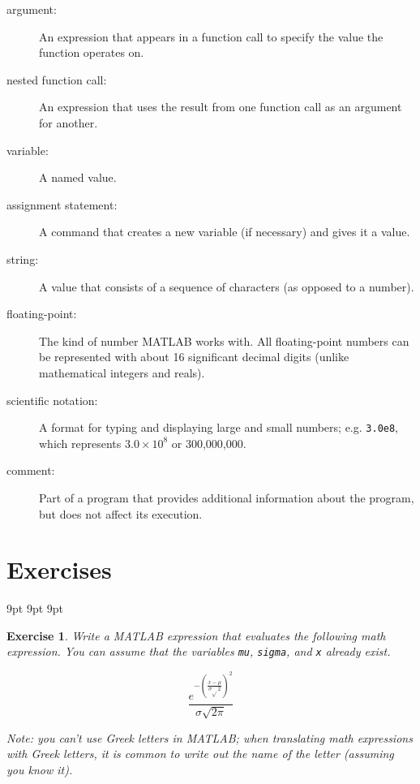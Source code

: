 \documentclass[
]{book}
\begin{document}
\begin{description}
\item[argument:] An expression that appears in a function call to
specify the value the function operates on.

\item[nested function call:] An expression that uses the result from
one function call as an argument for another.

\item[variable:] A named value.

\item[assignment statement:] A command that creates a new variable
(if necessary) and gives it a value.

\item[string:] A value that consists of a sequence of characters (as
opposed to a number).

\item[floating-point:] The kind of number MATLAB works with.  All
floating-point numbers can be represented with about 16 significant
decimal digits (unlike mathematical integers and reals).

\item[scientific notation:] A format for typing and displaying large
and small numbers; e.g. {\tt 3.0e8}, which represents $3.0 \times 10^8$
or 300,000,000.

\item[comment:] Part of a program that provides additional information
about the program, but does not affect its execution.

\end{description}


\section{Exercises}

     {9pt}%
     {9pt}%
     {\itshape}%
     {}%
     {\bfseries}%
     {}%
     {9pt}%
     {}%


\theoremstyle{myex}
\newtheorem{ex}{Exercise}[chapter]

\begin{ex}
Write a MATLAB expression that evaluates the
following math expression.  You can assume that the variables
{\tt mu}, {\tt sigma}, and {\tt x} already exist.

\begin{equation}
\frac{e^{- \left( \frac{x-\mu}{\sigma \sqrt{}2} \right) ^2}}
{\sigma \sqrt{2 \pi}}
\end{equation}

Note: you can't use Greek letters in MATLAB; when translating
math expressions with Greek letters, it is common to write out
the name of the letter (assuming you know it).
\end{ex}
\end{document}
